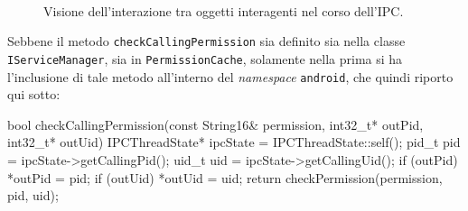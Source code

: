 \begin{figure}[thp]
\\
\caption{Visione dell'interazione tra oggetti interagenti nel corso dell'IPC.}
\label{fig:binderconclusion}
\end{figure}
Sebbene il metodo \texttt{checkCallingPermission} sia definito sia nella classe
\texttt{\small IServiceManager}, sia in \texttt{PermissionCache}, solamente nella prima si
ha l'inclusione di tale metodo all'interno del \textit{namespace} \texttt{android}, che
quindi riporto qui sotto:
\begin{cpp}
bool checkCallingPermission(const String16& permission, int32_t* outPid, int32_t* outUid)
{
    IPCThreadState* ipcState = IPCThreadState::self();
    pid_t pid = ipcState->getCallingPid();
    uid_t uid = ipcState->getCallingUid();
    if (outPid) *outPid = pid;
    if (outUid) *outUid = uid;
    return checkPermission(permission, pid, uid);
}
\end{cpp}

